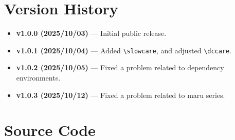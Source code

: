 \documentclass[luatex,fontsize=10pt,paper=b5,twoside]{jlreq}%
\begin{document}

\section{Version History}

\begin{itemize}
    \item \textbf{v1.0.0 (2025/10/03)} --- Initial public release.
    \item \textbf{v1.0.1 (2025/10/04)} --- Added \verb|\slowcare|, and adjusted \verb|\dccare|.
    \item \textbf{v1.0.2 (2025/10/05)} --- Fixed a problem related to dependency environments.
    \item \textbf{v1.0.3 (2025/10/12)} --- Fixed a problem related to maru series.
\end{itemize}

\section{Source Code}
\end{document}
